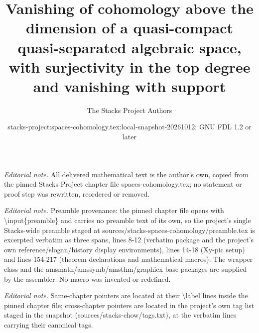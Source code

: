 \documentclass[10pt,a4paper]{amsart}
\title{Vanishing of cohomology above the dimension of a quasi-compact quasi-separated algebraic space, with surjectivity in the top degree and vanishing with support}
\author{The Stacks Project Authors}
\date{stacks-project:spaces-cohomology.tex:local-snapshot-20261012; GNU FDL 1.2 or later}
\theoremstyle{plain}
\theoremstyle{definition}
\theoremstyle{remark}
\numberwithin{equation}{subsection}
\begin{document}
\maketitle
\noindent\textit{Editorial note.} All delivered mathematical text is the author's own, copied from the pinned Stacks Project chapter file spaces-cohomology.tex; no statement or proof step was rewritten, reordered or removed.\par\medskip
\noindent\textit{Editorial note.} Preamble provenance: the pinned chapter file opens with \textbackslash{}input\{preamble\} and carries no preamble text of its own, so the project's single Stacks-wide preamble staged at sources/stacks-spaces-cohomology/preamble.tex is excerpted verbatim as three spans, lines 8-12 (verbatim package and the project's own reference/slogan/history display environments), lines 14-18 (Xy-pic setup) and lines 154-217 (theorem declarations and mathematical macros). The wrapper class and the amsmath/amssymb/amsthm/graphicx base packages are supplied by the assembler. No macro was invented or redefined.\par\medskip
\noindent\textit{Editorial note.} Same-chapter pointers are located at their \textbackslash{}label lines inside the pinned chapter file; cross-chapter pointers are located in the project's own tag list staged in the snapshot (sources/stacks-chow/tags.txt), at the verbatim lines carrying their canonical tags.\par\medskip
\end{document}
